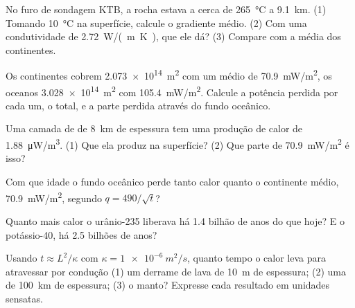 \begin{exercise}[$\star\star$]\label{exo:g12:internal-heat:6}
No furo de sondagem KTB, a rocha estava a cerca de \qty{265}{\celsius} a
\qty{9.1}{km}. (1) Tomando \qty{10}{\celsius} na superfície, calcule o
gradiente médio. (2) Com uma condutividade de \qty{2.72}{W/(m.K)}, que  ele dá? (3) Compare com a média dos continentes.
\end{exercise}

\begin{exercise}[$\star\star$]\label{exo:g12:internal-heat:7}
Os continentes cobrem \qty{2.073e14}{m^2} com um  médio de
\qty{70.9}{mW/m^2}, os oceanos \qty{3.028e14}{m^2} com
\qty{105.4}{mW/m^2}. Calcule a potência perdida por cada um, o total, e a
parte perdida através do fundo oceânico.
\end{exercise}

\begin{exercise}[$\star\star$]\label{exo:g12:internal-heat:8}
Uma camada de  de \qty{8}{km} de espessura tem uma produção de
calor de \qty{1.88}{\micro W/m^3}. (1) Que  ela produz na
superfície? (2) Que parte de \qty{70.9}{mW/m^2} é isso?
\end{exercise}

\begin{exercise}[$\star\star$]\label{exo:g12:internal-heat:9}
Com que idade o fundo oceânico perde tanto calor quanto o continente médio,
\qty{70.9}{mW/m^2}, segundo $q = 490/\sqrt{t}$?
\end{exercise}

\begin{exercise}[$\star\star$]\label{exo:g12:internal-heat:10}
Quanto mais calor o urânio-235 liberava há 1.4 bilhão de anos do que hoje? E
o potássio-40, há 2.5 bilhões de anos?
\end{exercise}

\begin{exercise}[$\star\star$]\label{exo:g12:internal-heat:11}
Usando $t \approx L^2/\kappa$ com $\kappa = \qty{1e-6}{m^2/s}$, quanto tempo
o calor leva para atravessar por condução (1) um derrame de lava de
\qty{10}{m} de espessura; (2) uma  de \qty{100}{km} de espessura;
(3) o manto? Expresse cada resultado em unidades sensatas.
\end{exercise}

